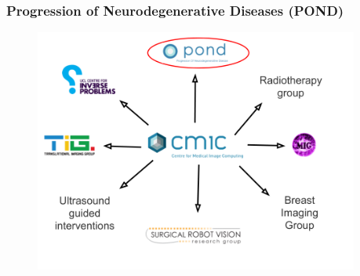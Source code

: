 \documentclass[8pt,xcolor=table,aspectratio=169]{beamer}
\begin{document}
\begin{frame}
\frametitle{Progression of Neurodegenerative Diseases (POND)}

\begin{figure}
\centering
\includegraphics[height=8cm]{pond_diagram} 
\end{figure}



\end{frame}
\end{document}
